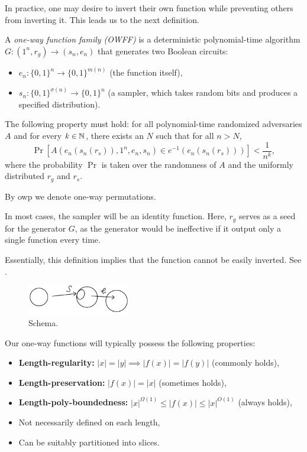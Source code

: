 In practice, one may desire to invert their own function while preventing others from inverting it.
This leads us to the next definition.

\begin{definition}
    A \emph{one-way function family (OWFF)} is a deterministic polynomial-time algorithm $G \colon (1^n, r_g) \to (s_n, e_n)$ that generates two Boolean circuits:
    \begin{itemize}
        \item $e_n \colon \{0, 1\}^n \to \{0, 1\}^{m(n)}$ (the function itself),
        \item $s_n \colon \{0, 1\}^{\sigma(n)} \to \{0, 1\}^n$ (a sampler, which takes random bits and produces a specified distribution).
    \end{itemize}
    The following property must hold: for all polynomial-time randomized adversaries $A$ and for every $k \in \mathbb{N}$, there exists an $N$ such that for all $n > N$,
    \[
        \Pr[A(e_n(s_n(r_s)), 1^n, e_n, s_n) \in e^{-1}(e_n(s_n(r_s)))] < \frac{1}{n^k},
    \]
    where the probability $\Pr$ is taken over the randomness of $A$ and the uniformly distributed $r_g$ and $r_s$.
\end{definition}
By owp we denote one-way permutations.

In most cases, the sampler will be an identity function.
Here, $r_g$ serves as a seed for the generator $G$, as the generator would be ineffective if it output only a single function every time.

Essentially, this definition implies that the function cannot be easily inverted.
See .

\begin{figure}[H]
    \centering
    \includegraphics[width=0.4\textwidth]{figures/2FC91310-FBF1-4D04-ABDB-24F1FDF8893A}
    \caption{Schema.}
    \label{fig:2fc91310-fbf1-4d04-abdb-24f1fdf8893a}
\end{figure}

Our one-way functions will typically possess the following properties:
\begin{itemize}
    \item \textbf{Length-regularity:} $|x| = |y| \implies |f(x)| = |f(y)|$ (commonly holds),
    \item \textbf{Length-preservation:} $|f(x)| = |x|$ (sometimes holds),
    \item \textbf{Length-poly-boundedness:} $|x|^{\Omega(1)} \leq |f(x)| \leq |x|^{O(1)}$ (always holds),
    \item Not necessarily defined on each length,
    \item Can be suitably partitioned into slices.
\end{itemize}

